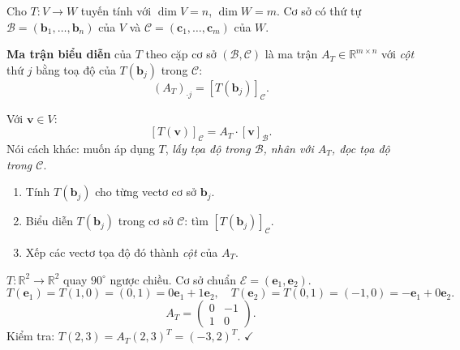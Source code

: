 \documentclass[12pt,a4paper]{article}
\begin{document}
\begin{dinhnghia}
  Cho $T: V \to W$ tuyến tính với $\dim V = n$, $\dim W = m$. Cơ sở có thứ tự $\mathcal{B} = (\mathbf{b}_1, \ldots, \mathbf{b}_n)$ của $V$ và $\mathcal{C} = (\mathbf{c}_1, \ldots, \mathbf{c}_m)$ của $W$.

  \textbf{Ma trận biểu diễn} của $T$ theo cặp cơ sở $(\mathcal{B}, \mathcal{C})$ là ma trận $A_T \in \mathbb{R}^{m\times n}$ với \emph{cột} thứ $j$ bằng toạ độ của $T(\mathbf{b}_j)$ trong $\mathcal{C}$:
  \[
    (A_T)_{\cdot j} = [T(\mathbf{b}_j)]_{\mathcal{C}}.
  \]
\end{dinhnghia}

\begin{congthuc}[title={Mối quan hệ căn bản}]
Với $\mathbf{v} \in V$:
\[
  [T(\mathbf{v})]_{\mathcal{C}} = A_T \cdot [\mathbf{v}]_{\mathcal{B}}.
\]
Nói cách khác: muốn áp dụng $T$, \emph{lấy tọa độ trong $\mathcal{B}$, nhân với $A_T$, đọc tọa độ trong $\mathcal{C}$}.
\end{congthuc}

\begin{phuongphap}[title={Xây dựng $A_T$ -- 3 bước}]
\begin{enumerate}
  \item Tính $T(\mathbf{b}_j)$ cho từng vectơ cơ sở $\mathbf{b}_j$.
  \item Biểu diễn $T(\mathbf{b}_j)$ trong cơ sở $\mathcal{C}$: tìm $[T(\mathbf{b}_j)]_{\mathcal{C}}$.
  \item Xếp các vectơ tọa độ đó thành \emph{cột} của $A_T$.
\end{enumerate}
\end{phuongphap}

\begin{vidu}[title={Phép quay $90^\circ$ ngược chiều kim đồng hồ}]
$T: \mathbb{R}^2 \to \mathbb{R}^2$ quay $90^\circ$ ngược chiều. Cơ sở chuẩn $\mathcal{E} = (\mathbf{e}_1, \mathbf{e}_2)$.
\[
  T(\mathbf{e}_1) = T(1,0) = (0,1) = 0\mathbf{e}_1 + 1\mathbf{e}_2,\quad
  T(\mathbf{e}_2) = T(0,1) = (-1,0) = -\mathbf{e}_1 + 0\mathbf{e}_2.
\]
\[
  A_T = \begin{pmatrix}0 & -1\\ 1 & 0\end{pmatrix}.
\]
Kiểm tra: $T(2,3) = A_T(2,3)^T = (-3, 2)^T$. $\checkmark$
\end{vidu}
\end{document}
